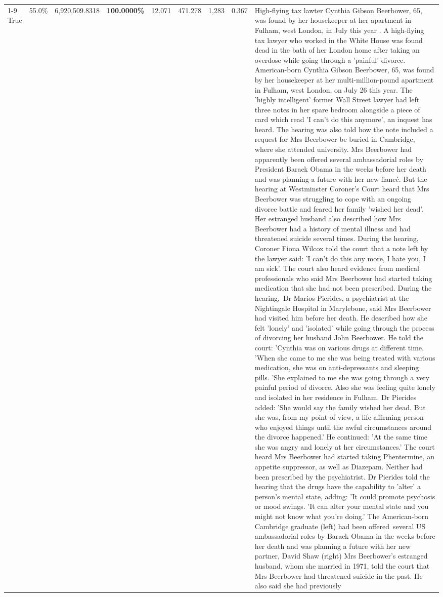 \begin{table}[H]
\begin{tabular}{lllrlllll}
\cline{1-9}
True & 55.0\% & 6,920,509.8318 & \bfseries \color{red} 100.0000\% & 12.071 & 471.278 & 1,283 & 0.367 & High-flying tax lawter Cynthia Gibson Beerbower, 65, was found by her housekeeper at her apartment in Fulham, west London, in July this year . A high-flying tax lawyer who worked in the White House was found dead in the bath of her London home after taking an overdose while going through a 'painful' divorce. American-born Cynthia Gibson Beerbower, 65, was found by her housekeeper at her multi-million-pound apartment in Fulham, west London, on July 26 this year. The 'highly intelligent' former Wall Street lawyer had left three notes in her spare bedroom alongside a piece of card which read 'I can't do this anymore', an inquest has heard. The hearing was also told how the note included a request for Mrs Beerbower be buried in Cambridge, where she attended university. Mrs Beerbower had apparently been offered several ambassadorial roles by President Barack Obama in the weeks before her death and was planning a future with her new fiancé. But the hearing at Westminster Coroner's Court heard that Mrs Beerbower was struggling to cope with an ongoing divorce battle and feared her family 'wished her dead'. Her estranged husband also described how Mrs Beerbower had a history of mental illness and had threatened suicide several times. During the hearing, Coroner Fiona Wilcox told the court that a note left by the lawyer said: 'I can't do this any more, I hate you, I am sick'. The court also heard evidence from medical professionals who said Mrs Beerbower had started taking medication that she had not been prescribed. During the hearing, Dr Marios Pierides, a psychiatrist at the Nightingale Hospital in Marylebone, said Mrs Beerbower had visited him before her death. He described how she felt 'lonely' and 'isolated' while going through the process of divorcing her husband John Beerbower. He told the court: 'Cynthia was on various drugs at different time. 'When she came to me she was being treated with various medication, she was on anti-depressants and sleeping pills. 'She explained to me she was going through a very painful period of divorce. Also she was feeling quite lonely and isolated in her residence in Fulham. Dr Pierides added: 'She would say the family wished her dead. But she was, from my point of view, a life affirming person who enjoyed things until the awful circumstances around the divorce happened.' He continued: 'At the same time she was angry and lonely at her circumstances.' The court heard Mrs Beerbower had started taking Phentermine, an appetite suppressor, as well as Diazepam. Neither had been prescribed by the psychiatrist. Dr Pierides told the hearing that the drugs have the capability to 'alter' a person's mental state, adding: 'It could promote psychosis or mood swings. 'It can alter your mental state and you might not know what you're doing.' The American-born Cambridge graduate (left) had been offered several US ambassadorial roles by Barack Obama in the weeks before her death and was planning a future with her new partner, David Shaw (right) Mrs Beerbower's estranged husband, whom she married in 1971, told the court that Mrs Beerbower had threatened suicide in the past. He also said she had previously 
\end{tabular}
\end{table}
